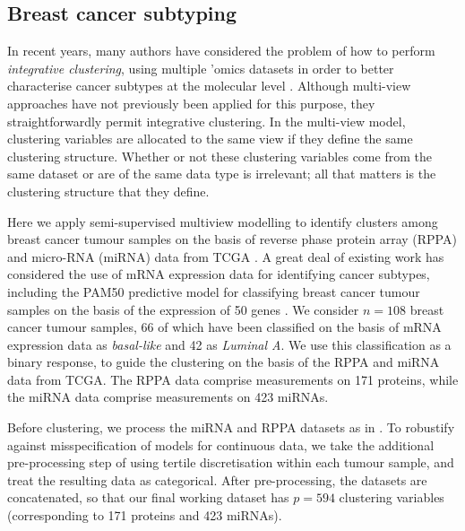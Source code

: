 \documentclass[12pt]{article}
\begin{document}
\subsection{Breast cancer subtyping}\label{brcaexample}
In recent years, many authors \citep[e.g.][]{Shen2009,Kirk2012,Lock2013,Savage2013} have considered the problem of how to perform {\em integrative clustering}, using multiple 'omics datasets in order to better characterise cancer subtypes at the molecular level \citep[see also][for a reveiw]{Kristensen2014}.  Although multi-view approaches have not previously been applied for this purpose, they straightforwardly permit integrative clustering.  In the multi-view model, clustering variables are allocated to the same view if they define the same clustering structure.  Whether or not these clustering variables come from the same dataset or are of the same data type is irrelevant; all that matters is the clustering structure that they define.  %


Here we apply semi-supervised multiview modelling to identify clusters among breast cancer tumour samples on the basis of reverse phase protein array (RPPA) and micro-RNA (miRNA) data from TCGA \citep{TCGA2012}.  A great deal of existing work has considered the use of mRNA expression data for identifying cancer subtypes, including the PAM50 predictive model for classifying breast cancer tumour samples on the basis of the expression of 50 genes \citep{Parker2009}.  We consider $n = 108$ breast cancer tumour samples, 66 of which have been classified on the basis of mRNA expression data as {\em basal-like} and 42 as {\em Luminal A}.  We use this classification as a binary response, to guide the clustering on the basis of the RPPA and miRNA data from TCGA.  The RPPA data comprise measurements on 171 proteins, while the miRNA data comprise measurements on 423 miRNAs.  

Before clustering, we process the miRNA and RPPA datasets as in \citet{Lock2013}.  To robustify against misspecification of models for continuous data, we take the additional pre-processing step of using tertile discretisation within each tumour sample, and treat the resulting data as categorical.  After pre-processing, the datasets are concatenated, so that our final working dataset has $p =  594$ clustering variables (corresponding to 171 proteins and 423 miRNAs).
\end{document}
